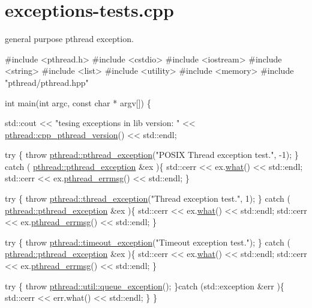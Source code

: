 \hypertarget{exceptions-tests_8cpp-example}{\section{exceptions-\/tests.\+cpp}
}
general purpose pthread exception.


\begin{DoxyCodeInclude}
\textcolor{preprocessor}{#include <pthread.h>}
\textcolor{preprocessor}{#include <cstdio>}
\textcolor{preprocessor}{#include <iostream>}
\textcolor{preprocessor}{#include <string>}
\textcolor{preprocessor}{#include <list>}
\textcolor{preprocessor}{#include <utility>}
\textcolor{preprocessor}{#include <memory>}
\textcolor{preprocessor}{#include "pthread/pthread.hpp"}

\textcolor{keywordtype}{int} main(\textcolor{keywordtype}{int} argc, \textcolor{keyword}{const} \textcolor{keywordtype}{char} * argv[]) \{
  
  std::cout << \textcolor{stringliteral}{"tesing exceptions in lib version: "} << 
      \hyperlink{namespacepthread_ad04d8bbcf57d64ba29047b53432a9ceb}{pthread::cpp\_pthread\_version}() << std::endl;

  \textcolor{keywordflow}{try} \{
    \textcolor{keywordflow}{throw} \hyperlink{classpthread_1_1pthread__exception}{pthread::pthread\_exception}(\textcolor{stringliteral}{"POSIX Thread exception test."}, -1);
  \} \textcolor{keywordflow}{catch} ( \hyperlink{classpthread_1_1pthread__exception}{pthread::pthread\_exception} &ex )\{
    std::cerr << ex.\hyperlink{classpthread_1_1pthread__exception_ae54eed6aa72bac1c503554ddd857e466}{what}() << std::endl;
    std::cerr << ex.\hyperlink{classpthread_1_1pthread__exception_afc17488e8f6160865f1beb4d6fc20d2a}{pthread\_errmsg}() << std::endl;
  \}

  \textcolor{keywordflow}{try} \{
    \textcolor{keywordflow}{throw} \hyperlink{classpthread_1_1thread__exception}{pthread::thread\_exception}(\textcolor{stringliteral}{"Thread exception test."}, 1);
  \} \textcolor{keywordflow}{catch} ( \hyperlink{classpthread_1_1pthread__exception}{pthread::pthread\_exception} &ex )\{
    std::cerr << ex.\hyperlink{classpthread_1_1pthread__exception_ae54eed6aa72bac1c503554ddd857e466}{what}() << std::endl;
    std::cerr << ex.\hyperlink{classpthread_1_1pthread__exception_afc17488e8f6160865f1beb4d6fc20d2a}{pthread\_errmsg}() << std::endl;
  \}

  \textcolor{keywordflow}{try} \{
    \textcolor{keywordflow}{throw} \hyperlink{classpthread_1_1timeout__exception}{pthread::timeout\_exception}(\textcolor{stringliteral}{"Timeout exception test."});
  \} \textcolor{keywordflow}{catch} ( \hyperlink{classpthread_1_1pthread__exception}{pthread::pthread\_exception} &ex )\{
    std::cerr << ex.\hyperlink{classpthread_1_1pthread__exception_ae54eed6aa72bac1c503554ddd857e466}{what}() << std::endl;
    std::cerr << ex.\hyperlink{classpthread_1_1pthread__exception_afc17488e8f6160865f1beb4d6fc20d2a}{pthread\_errmsg}() << std::endl;
  \}

  \textcolor{keywordflow}{try} \{
    \textcolor{keywordflow}{throw} \hyperlink{classpthread_1_1util_1_1queue__exception}{pthread::util::queue\_exception}();
  \}\textcolor{keywordflow}{catch} (std::exception &err )\{
    std::cerr << err.what() << std::endl;
  \}
\}
\end{DoxyCodeInclude}
 